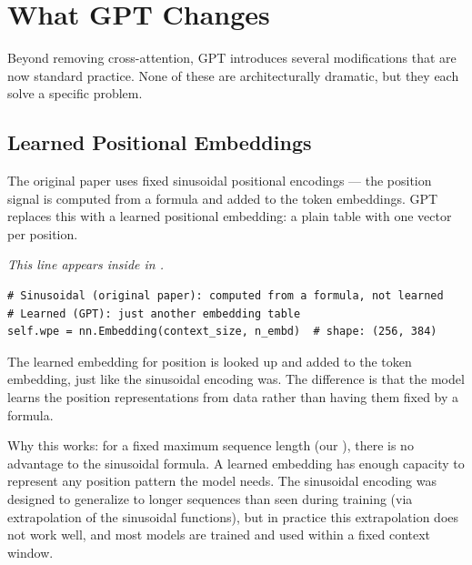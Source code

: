 \section{What GPT Changes}

Beyond removing cross-attention, GPT introduces several modifications that are now standard practice. None of these are architecturally dramatic, but they each solve a specific problem.

\subsection{Learned Positional Embeddings}

The original paper uses fixed sinusoidal positional encodings --- the position signal is computed from a formula and added to the token embeddings. GPT replaces this with a learned positional embedding: a plain  table with one vector per position.

\concepttag
{\small\itshape This line appears inside  in .}
\begin{lstlisting}
# Sinusoidal (original paper): computed from a formula, not learned
# Learned (GPT): just another embedding table
self.wpe = nn.Embedding(context_size, n_embd)  # shape: (256, 384)
\end{lstlisting}

The learned embedding for position  is looked up and added to the token embedding, just like the sinusoidal encoding was. The difference is that the model learns the position representations from data rather than having them fixed by a formula.

Why this works: for a fixed maximum sequence length (our ), there is no advantage to the sinusoidal formula. A learned embedding has enough capacity to represent any position pattern the model needs. The sinusoidal encoding was designed to generalize to longer sequences than seen during training (via extrapolation of the sinusoidal functions), but in practice this extrapolation does not work well, and most models are trained and used within a fixed context window.


